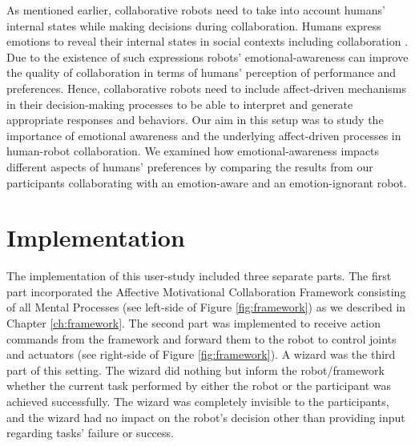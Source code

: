 \documentclass[12pt]{report}
\begin{document}
As mentioned earlier, collaborative robots need to take into account humans'
internal states while making decisions during collaboration. Humans express
emotions to reveal their internal states in social contexts including
collaboration \cite{breazeal:sociable-interactive-robots}. Due to the existence
of such expressions robots' emotional-awareness can improve the quality of
collaboration in terms of humans' perception of performance and preferences.
Hence, collaborative robots need to include affect-driven mechanisms in their
decision-making processes to be able to interpret and generate appropriate
responses and behaviors. Our aim in this setup was to study the importance of
emotional awareness and the underlying affect-driven processes in human-robot
collaboration. We examined how emotional-awareness impacts different aspects of
humans' preferences by comparing the results from our participants collaborating
with an emotion-aware and an emotion-ignorant robot.

% 
% 
% 
% 
\section{Implementation}
The implementation of this user-study included three separate parts. The first
part incorporated the Affective Motivational Collaboration Framework consisting
of all Mental Processes (see left-side of Figure \ref{fig:framework}) as we
described in Chapter \ref{ch:framework}. The second part was implemented to
receive action commands from the framework and forward them to the robot to
control joints and actuators (see right-side of Figure \ref{fig:framework}).
A wizard was the third part of this setting. The wizard did nothing but inform
the robot/framework whether the current task performed by either the robot or
the participant was achieved successfully. The wizard was completely invisible
to the participants, and the wizard had no impact on the robot's decision other
than providing input regarding tasks' failure or success.
\end{document}
